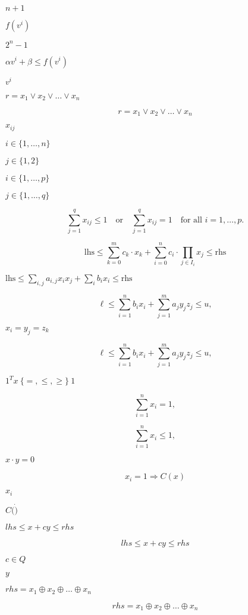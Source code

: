 \documentclass{article}
\begin{document}
$ n + 1 $
\pagebreak

$ f(v^i) $
\pagebreak

$ 2^n - 1 $
\pagebreak

$ \alpha v^i + \beta \le f(v^i) $
\pagebreak

$ v^i $
\pagebreak

$r = x_1 \vee x_2 \vee \dots  \vee x_n$
\pagebreak

\[
   r = x_1 \vee x_2 \vee \dots  \vee x_n
\]
\pagebreak

$x_{ij}$
\pagebreak

$i \in \{1, \dots, n\}$
\pagebreak

$j \in \{1, 2\}$
\pagebreak

$i \in \{1, \dots, p\}$
\pagebreak

$j \in \{1, \dots, q\}$
\pagebreak

\[
   \sum_{j = 1}^q x_{ij} \leq 1  \quad \mbox{or} \quad \sum_{j = 1}^q x_{ij} = 1 \quad \mbox{for all }i = 1, \ldots, p.
\]
\pagebreak

\[
\mbox{lhs} \leq \sum_{k=0}^m c_k \cdot x_k  +  \sum_{i=0}^n c_i \cdot \prod_{j \in I_i} x_j \leq \mbox{rhs}
\]
\pagebreak

$\textrm{lhs} \leq \sum_{i,j} a_{i,j} x_ix_j + \sum_i b_i x_i \leq \textrm{rhs}$
\pagebreak

\[
\ell \leq \sum_{i=1}^n b_i x_i + \sum_{j=1}^m a_j y_j z_j \leq u,
\]
\pagebreak

$x_i = y_j = z_k$
\pagebreak

\[
\ell \leq \sum_{i=1}^n b_i x_i + \sum_{j=1}^m a_j y_jz_j \leq u,
\]
\pagebreak

$1^T x\ \{=, \le, \ge\}\ 1$
\pagebreak

\[
  \sum_{i=1}^n x_i = 1,
\]
\pagebreak

\[
  \sum_{i=1}^n x_i \le 1,
\]
\pagebreak

$x \cdot y = 0$
\pagebreak

\[
   x_i = 1 \Rightarrow C(x)
\]
\pagebreak

$ x_i $
\pagebreak

$ C(\dot) $
\pagebreak

$lhs \leq x + c y \leq rhs$
\pagebreak

\[
  lhs \leq x + c y \leq rhs
\]
\pagebreak

$c \in Q$
\pagebreak

$y$
\pagebreak

$rhs = x_1 \oplus x_2 \oplus \dots  \oplus x_n$
\pagebreak

\[
   rhs = x_1 \oplus x_2 \oplus \dots  \oplus x_n
\]
\pagebreak
\end{document}
